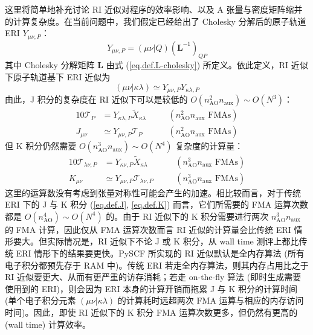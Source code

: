 这里将简单地补充讨论 RI 近似对程序的效率影响、以及 A 张量与密度矩阵缩并的计算复杂度。在当前问题中，我们假定已经给出了 Cholesky 分解后的原子轨道 ERI $Y_{\mu \nu, P}$：
\begin{equation}
  Y_{\mu \nu, P} = (\mu \nu | Q) (\mathbf{L}^{-1})_{QP}
\end{equation}
其中 Cholesky 分解矩阵 $\mathbf{L}$ 由式 (\ref{eq.def.L-cholesky}) 所定义。依此定义，RI 近似下原子轨道基下 ERI 近似为
\begin{equation}
  (\mu \nu | \kappa \lambda) \simeq Y_{\mu \nu, P} Y_{\kappa \lambda, P}
\end{equation}
由此，J 积分的复杂度在 RI 近似下可以是较低的 $O(n_\mathrm{AO}^2 n_\mathrm{aux}) \sim O(N^3)$：
\begin{alignat*}{10}
  \mathscr{T}_{P} &= Y_{\kappa \lambda, P} \tilde X_{\kappa \lambda} &&\quad (n_\mathrm{AO}^2 n_\mathrm{aux} \text{ FMAs}) \\
  J_{\mu \nu} &\simeq Y_{\mu \nu, P} \mathscr{T}_P &&\quad (n_\mathrm{AO}^2 n_\mathrm{aux} \text{ FMAs})
\end{alignat*}
但 K 积分仍然需要 $O(n_\mathrm{AO}^3 n_\mathrm{aux}) \sim O(N^4)$ 复杂度的计算量：
\begin{alignat*}{10}
  \mathscr{T}_{\lambda \nu, P} &= Y_{\kappa \nu, P} \tilde X_{\kappa \lambda} &&\quad (n_\mathrm{AO}^3 n_\mathrm{aux} \text{ FMAs}) \\
  K_{\mu \nu} &\simeq Y_{\mu \nu, P} \mathscr{T}_{\lambda \nu, P} &&\quad (n_\mathrm{AO}^3 n_\mathrm{aux} \text{ FMAs})
\end{alignat*}
这里的运算数没有考虑到张量对称性可能会产生的加速。相比较而言，对于传统 ERI 下的 J 与 K 积分 (\ref{eq.def.J}, \ref{eq.def.K}) 而言，它们所需要的 FMA 运算次数都是 $O(n_\mathrm{AO}^4) \sim O(N^4)$ 的。由于 RI 近似下的 K 积分需要进行两次 $n_\mathrm{AO}^3 n_\mathrm{aux}$ 的 FMA 计算，因此仅从 FMA 运算次数而言 RI 近似的计算量会比传统 ERI 情形要大。但实际情况是，RI 近似下不论 J 或 K 积分，从 wall time 测评上都比传统 ERI 情形下的结果要更快。PySCF 所实现的 RI 近似默认是全内存算法 (所有电子积分都预先存于 RAM 中)。传统 ERI 若走全内存算法，则其内存占用比之于 RI 近似要更大、从而有更严重的访存消耗；若走 on-the-fly 算法 (即时生成需要使用到的 ERI)，则会因为 ERI 本身的计算开销而拖累 J 与 K 积分的计算时间 (单个电子积分元素 $(\mu \nu | \kappa \lambda)$ 的计算耗时远超两次 FMA 运算与相应的内存访问时间)。因此，即使 RI 近似下的 K 积分 FMA 运算次数更多，但仍然有更高的 (wall time) 计算效率。

